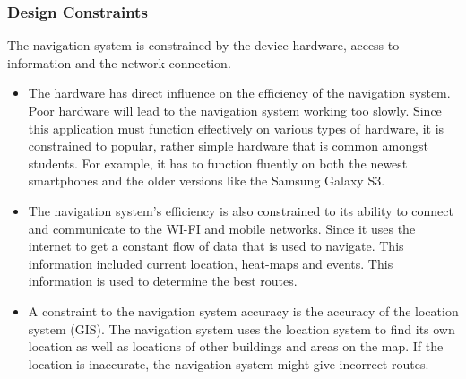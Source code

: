 \documentclass[runningheads,a4paper]{article}
\begin{document}
\subsubsection {Design Constraints}
The navigation system is constrained by the device hardware, access to information and the network connection.

\begin{itemize}
\item The hardware has direct influence on the efficiency of the navigation system. Poor hardware will lead to the navigation system working too slowly. Since this application must function effectively on various types of hardware, it is constrained to popular, rather simple hardware that is common amongst students. For example, it has to function fluently on both the newest smartphones and the older versions like the Samsung Galaxy S3.

\item The navigation system’s efficiency is also constrained to its ability to connect and communicate to the WI-FI and mobile networks. Since it uses the internet to get a constant flow of data that is used to navigate. This information included current location, heat-maps and events. This information is used to determine the best routes.

\item A constraint to the navigation system accuracy is the accuracy of the location system (GIS). The navigation system uses the location system to find its own location as well as locations of other buildings and areas on the map. If the location is inaccurate, the navigation system might give incorrect routes. 

\end{itemize}
\end{document}
